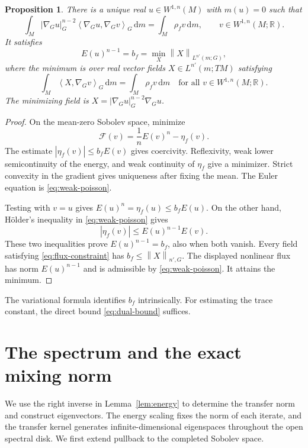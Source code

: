 \documentclass[11pt,reqno]{amsart}
\theoremstyle{plain}
\newtheorem{proposition}[theorem]{Proposition}
\theoremstyle{definition}
\theoremstyle{remark}
\newcommand{\R}{\mathbb R}
\newcommand{\norm}[1]{\left\lVert #1\right\rVert}
\newcommand{\ip}[2]{\left\langle #1,#2\right\rangle}
\newcommand{\dd}{\mathrm d}
\numberwithin{equation}{section}
\begin{document}
\begin{proposition}\label{prop:variational}
There is a unique real $u\in W^{1,n}(M)$ with $m(u)=0$ such that
\begin{equation}\label{eq:weak-poisson}
 \int_M|\nabla_Gu|_G^{n-2}
       \ip{\nabla_Gu}{\nabla_Gv}_G\,\dd m
 =\int_M\rho_fv\,\dd m,
 \qquad v\in W^{1,n}(M;\R).
\end{equation}
It satisfies
\begin{equation}\label{eq:dual-exact}
 E(u)^{n-1}=b_f
 =\min_X\norm{X}_{L^{n'}(m;G)},
\end{equation}
where the minimum is over real vector fields $X\in L^{n'}(m;TM)$ satisfying
\begin{equation}\label{eq:flux-constraint}
 \int_M\ip{X}{\nabla_Gv}_G\,\dd m=\int_M\rho_fv\,\dd m
 \quad\text{for all }v\in W^{1,n}(M;\R).
\end{equation}
The minimizing field is $X=|\nabla_Gu|_G^{n-2}\nabla_Gu$.
\end{proposition}

\begin{proof}
On the mean-zero Sobolev space, minimize
\[
 \mathcal F(v)=\frac1n E(v)^n-\eta_f(v).
\]
The estimate $|\eta_f(v)|\le b_fE(v)$ gives coercivity. Reflexivity, weak lower semicontinuity of the energy, and weak continuity of $\eta_f$ give a minimizer. Strict convexity in the gradient gives uniqueness after fixing the mean. The Euler equation is \eqref{eq:weak-poisson}.

Testing with $v=u$ gives $E(u)^n=\eta_f(u)\le b_fE(u)$. On the other hand, H\"older's inequality in \eqref{eq:weak-poisson} gives
\[
 |\eta_f(v)|\le E(u)^{n-1}E(v).
\]
These two inequalities prove $E(u)^{n-1}=b_f$, also when both vanish. Every field satisfying \eqref{eq:flux-constraint} has $b_f\le\norm{X}_{n',G}$. The displayed nonlinear flux has norm $E(u)^{n-1}$ and is admissible by \eqref{eq:weak-poisson}. It attains the minimum.
\end{proof}

The variational formula identifies $b_f$ intrinsically. For estimating the trace constant, the direct bound \eqref{eq:dual-bound} suffices.

\section{The spectrum and the exact mixing norm}\label{sec:spectrum}

We use the right inverse in Lemma~\ref{lem:energy} to determine the transfer norm and construct eigenvectors. The energy scaling fixes the norm of each iterate, and the transfer kernel generates infinite-dimensional eigenspaces throughout the open spectral disk. We first extend pullback to the completed Sobolev space.
\end{document}
